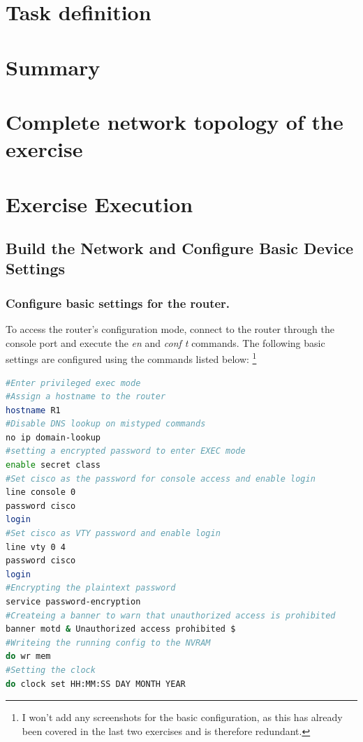 \documentclass[a4paper]{article}
\newcommand{\abc}{\hfill \break}
\newcommand{\ii}{\textit}
\begin{document}
\newpage

\section{Task definition}


\section{Summary}


\newpage

\section{Complete network topology of the exercise}

\newpage

\section{Exercise Execution}

\subsection{Build the Network and Configure Basic Device Settings}

\subsubsection{Configure basic settings for the router.}
To access the router's configuration mode, connect to the router through the console port and execute the \ii{en} and \ii{conf t} commands.\abc
The following basic settings are configured using the commands listed below: \footnote{I won't add any screenshots for the basic configuration, as this has already been covered in the last two exercises and is therefore redundant.}
\begin{lstlisting}[language=bash]
#Enter privileged exec mode
#Assign a hostname to the router
hostname R1
#Disable DNS lookup on mistyped commands
no ip domain-lookup
#setting a encrypted password to enter EXEC mode
enable secret class
#Set cisco as the password for console access and enable login
line console 0
password cisco
login
#Set cisco as VTY password and enable login
line vty 0 4
password cisco
login
#Encrypting the plaintext password
service password-encryption
#Createing a banner to warn that unauthorized access is prohibited
banner motd & Unauthorized access prohibited $
#Writeing the running config to the NVRAM
do wr mem
#Setting the clock
do clock set HH:MM:SS DAY MONTH YEAR
\end{lstlisting}
\end{document}
